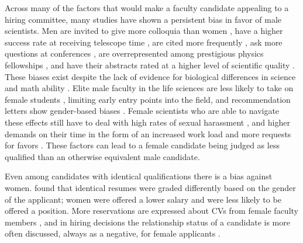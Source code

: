 \documentclass[modern]{aastex62}
\begin{document}
Across many of the factors that would make a faculty candidate appealing to a hiring committee, many studies have shown a persistent bias in favor of male scientists. Men are invited to give more colloquia than women \citep{nit17}, have a higher success rate at receiving telescope time \citep{rei14,lon16,pat16,spe18}, are cited more frequently \citep{cap17}, ask more questions at conferences \citep{dav14,pri14,sch17a,sch17}, are overrepresented among prestigious physics fellowships \citep{nor18}, and have their abstracts rated at a higher level of scientific quality \citep{kno13}. These biases exist despite the lack of evidence for biological differences in science and math ability \citep{hyd05,gig17}. Elite male faculty in the life sciences are less likely to take on female students \citep{she14}, limiting early entry points into the field, and recommendation letters show gender-based biases \citep{dut16,mad18}. Female scientists who are able to navigate these effects still have to deal with high rates of sexual harassment \citep{cla14,nat18}, and higher demands on their time in the form of an increased work load and more requests for favors \citep{el18}. These factors can lead to a female candidate being judged as less qualified than an otherwise equivalent male candidate. 


Even among candidates with identical qualifications there is a bias against women. \citet{mos12} found that identical resumes were graded differently based on the gender of the applicant; women were offered a lower salary and were less likely to be offered a position. More reservations are expressed about CVs from female faculty members \citep{ste99}, and in hiring decisions the relationship status of a candidate is more often discussed, always as a negative, for female applicants \citep{riv17}. 
\end{document}
